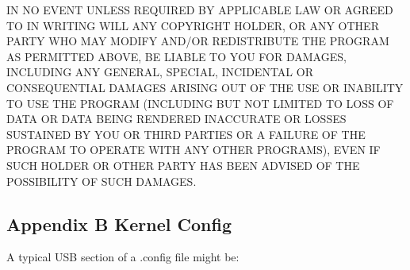 IN NO EVENT UNLESS REQUIRED BY APPLICABLE LAW OR AGREED TO IN WRITING WILL ANY
COPYRIGHT HOLDER, OR ANY OTHER PARTY WHO MAY MODIFY AND/OR REDISTRIBUTE THE
PROGRAM AS PERMITTED ABOVE, BE LIABLE TO YOU FOR DAMAGES, INCLUDING ANY
GENERAL, SPECIAL, INCIDENTAL OR CONSEQUENTIAL DAMAGES ARISING OUT OF THE USE
OR INABILITY TO USE THE PROGRAM (INCLUDING BUT NOT LIMITED TO LOSS OF DATA OR
DATA BEING RENDERED INACCURATE OR LOSSES SUSTAINED BY YOU OR THIRD PARTIES OR
A FAILURE OF THE PROGRAM TO OPERATE WITH ANY OTHER PROGRAMS), EVEN IF SUCH
HOLDER OR OTHER PARTY HAS BEEN ADVISED OF THE POSSIBILITY OF SUCH DAMAGES. 

\label{Kernel-Config}

\subsection*{Appendix B Kernel Config}

A typical USB section of a .config file might be:  

\label{index-Kernel-config-265}
\label{index-config_002c-Kernel-266}

